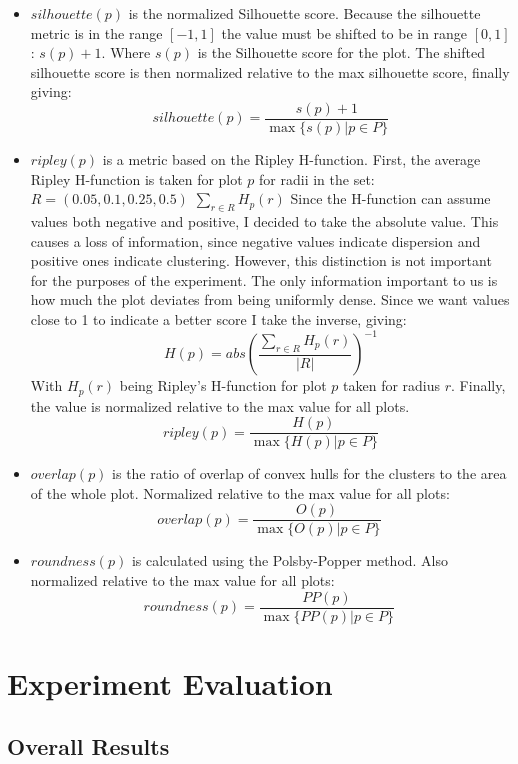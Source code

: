 \documentclass[a4paper, 12pt, twoside]{report}
\begin{document}
\begin{itemize}
\item \textbf{\(silhouette(p)\)} is the normalized Silhouette score. Because the silhouette metric is in the range \([-1, 1]\) the value must be shifted to be in range \([0, 1]\): \(s(p) + 1\). Where \(s(p)\) is the Silhouette score for the plot. The shifted silhouette score is then normalized relative to the max silhouette score, finally giving:
\[silhouette(p) = \frac{s(p) + 1}{\max\{s(p) | p \in P\}}\]
\item \textbf{ \(ripley(p)\) } is a metric based on the Ripley H-function. First, the average Ripley H-function is taken for plot \(p\) for radii in the set: \(R = (0.05, 0.1, 0.25, 0.5)\) \(\sum_{r \in R} H_{p}(r)\) Since the H-function can assume values both negative and positive, I decided to take the absolute value. This causes a loss of information, since negative values indicate dispersion and positive ones indicate clustering. However, this distinction is not important for the purposes of the experiment. The only information important to us is how much the plot deviates from being uniformly dense. Since we want values close to 1 to indicate a better score I take the inverse, giving:
\[H(p) = abs(\frac{\sum_{r \in R} H_{p}(r)}{|R|})^{-1}\]
With \(H_{p}(r)\) being Ripley's H-function for plot \(p\) taken for radius \(r\). Finally, the value is normalized relative to the max value for all plots.
\[ ripley(p) = \frac{H(p)}{ \max \{ H(p)| p \in P \}} \]
\item \textbf{ \(overlap(p)\) } is the ratio of overlap of convex hulls for the clusters to the area of the whole plot. Normalized relative to the max value for all plots:
\[ overlap(p) = \frac{O(p)}{ \max \{ O(p)| p \in P \}} \  \]
\item \textbf{ \(roundness(p)\) } is calculated using the Polsby-Popper method. Also normalized relative to the max value for all plots:
\[ roundness(p) = \frac{PP(p)}{ \max \{ PP(p)| p \in P \}} \  \]
\end{itemize}

\newpage

\chapter{Experiment Evaluation}
\label{sec:org8d9a4f0}
\section{Overall Results}
\label{sec:org5ce221c}
\end{document}

